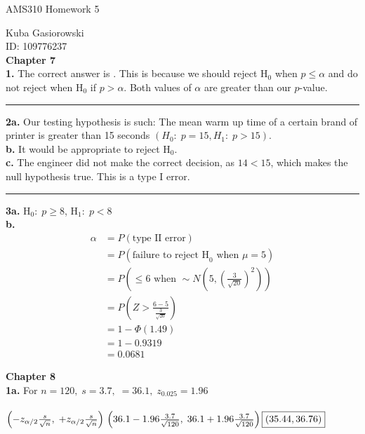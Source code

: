 \documentclass[12pt]{report}
\makeatletter
\newcommand*{\Xbar}{}%
\DeclareRobustCommand*{\Xbar}{%
	\mathpalette\@Xbar{}%
}
\newcommand*{\@Xbar}[2]{%
	\sbox0{$#1\mathrm{X}\m@th$}%
	\sbox2{$#1X\m@th$}%
	\rlap{%
		\hbox to\wd2{%
			\hfill
			$\overline{%
				\vrule width 0pt height\ht0 %
				\kern\wd0 %
			}$%
		}%
	}%
	\copy2 %
}
\newcommand*{\xbar}{}%
\DeclareRobustCommand*{\xbar}{%
	\mathpalette\@xbar{}%
}
\newcommand*{\@xbar}[2]{%
	\sbox0{$#1\mathrm{x}\m@th$}%
	\sbox2{$#1x\m@th$}%
	\rlap{%
		\hbox to\wd2{%
			\hfill
			$\overline{%
				\vrule width 0pt height\ht0 %
				\kern\wd0 %
			}$%
		}%
	}%
	\copy2 %
}
\newcommand{\sep}{\medskip\hrule\medskip}
\makeatother
\begin{document}
\Large
\centering
AMS310 Homework 5

\justify
\normalsize

Kuba Gasiorowski\\
ID: 109776237\\

\noindent \textbf{Chapter 7}\\

\noindent \textbf{1.} The correct answer is . This is because we should reject H$_0$ when $p \leq \alpha$ and do not reject when $\text{H}_0$ if $p > \alpha$. Both values of $\alpha$ are greater than our $p$-value.

\sep

\noindent \textbf{2a.} Our testing hypothesis is such: The mean warm up time of a certain brand of printer is greater than 15 seconds $\boxed{(H_0: \; p = 15, H_1: \; p > 15)}.$\\

\noindent \textbf{b.} It would be appropriate to reject $\boxed{\text{H}_0}$.\\

\noindent \textbf{c.} The engineer did not make the correct decision, as $14 < 15$, which makes the null hypothesis true. This is a type I error.

\sep

\noindent \textbf{3a.} H$_0 :\;p \geq 8$, H$_1 :\;p < 8$\\

\noindent \textbf{b.} 
\begin{align*}
	\alpha &= P(\text{type II error})\\
	&= P(\text{failure to reject H}_0 \text{ when } \mu = 5)\\
	&= P\left(\Xbar \leq 6\text{ when }\Xbar \sim N\left(5, \left(\frac{3}{\sqrt{20}}\right)^2\right)\right)\\ 
	&= P\left(Z > \frac{6-5}{\frac{3}{\sqrt{20}}}\right)\\
	&= 1-\Phi(1.49)\\
	&= 1-0.9319\\
	&= \boxed{0.0681}	
\end{align*}

\pagebreak
\noindent \textbf{Chapter 8}\\

\noindent \textbf{1a.} For $n = 120, \; s = 3.7, \; \xbar = 36.1, \; z_{0.025} = 1.96$\\\\
\begin{math}
	\left(\xbar - z_{\alpha/2}\frac{s}{\sqrt{n}}, \; \xbar + z_{\alpha/2}\frac{s}{\sqrt{n}}\right)\\
	 \left(36.1 - 1.96\frac{3.7}{\sqrt{120}}, \; 36.1 + 1.96\frac{3.7}{\sqrt{120}}\right)\\
	 \boxed{(35.44, 36.76)}\\
\end{math}
\end{document}

